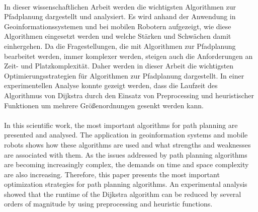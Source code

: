 \kurzfassung

\paragraph*{}
In dieser wissenschaftlichen Arbeit werden die wichtigsten Algorithmen zur Pfadplanung dargestellt und analysiert. Es wird anhand der Anwendung in Geoinformationssystemen und bei mobilen Robotern aufgezeigt, wie diese Algorithmen eingesetzt werden und welche Stärken und Schwächen damit einhergehen.  Da die Fragestellungen, die mit Algorithmen zur Pfadplanung bearbeitet werden, immer komplexer werden, steigen auch die Anforderungen an Zeit- und Platzkomplexität. Daher werden in dieser Arbeit die wichtigsten Optimierungsstrategien für Algorithmen zur Pfadplanung dargestellt. In einer experimentellen Analyse konnte gezeigt werden, dass die Laufzeit des Algorithmus von Dijkstra durch den Einsatz von Preprocessing und heuristischer Funktionen um mehrere Größenordnungen gesenkt werden kann. 

\paragraph*{}
In this scientific work, the most important algorithms for path planning are presented and analysed. The application in geoinformation systems and mobile robots shows how these algorithms are used and what strengths and weaknesses are associated with them. As the issues addressed by path planning algorithms are becoming increasingly complex, the demands on time and space complexity are also increasing. Therefore, this paper presents the most important optimization strategies for path planning algorithms. An experimental analysis showed that the runtime of the Dijkstra algorithm can be reduced by several orders of magnitude by using preprocessing and heuristic functions.
